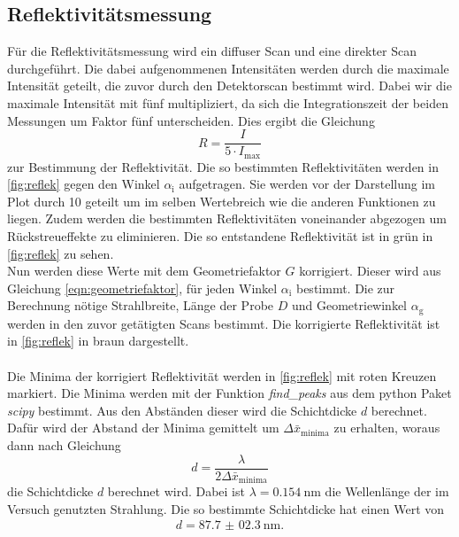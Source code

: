\subsection{Reflektivitätsmessung}
Für die Reflektivitätsmessung wird ein diffuser Scan und eine direkter Scan durchgeführt.
Die dabei aufgenommenen Intensitäten werden durch die maximale Intensität geteilt, die zuvor durch den Detektorscan bestimmt wird.
Dabei wir die maximale Intensität mit fünf multipliziert, da sich die Integrationszeit der beiden Messungen um Faktor fünf unterscheiden.
Dies ergibt die Gleichung 
\begin{equation*}
    R = \frac{I}{5\cdot I_\text{max}}
\end{equation*} 
zur Bestimmung der Reflektivität.
Die so bestimmten Reflektivitäten werden in \autoref{fig:reflek} gegen den Winkel $\alpha_\text{i}$ aufgetragen.
Sie werden vor der Darstellung im Plot durch 10 geteilt um im selben Wertebreich wie die anderen Funktionen zu liegen.
Zudem werden die bestimmten Reflektivitäten voneinander abgezogen um Rückstreueffekte zu eliminieren.
Die so entstandene Reflektivität ist in grün in \autoref{fig:reflek} zu sehen.
\\
Nun werden diese Werte mit dem Geometriefaktor $G$ korrigiert.
Dieser wird aus Gleichung \eqref{eqn:geometriefaktor}, für jeden Winkel $\alpha_\text{i}$ bestimmt.
Die zur Berechnung nötige Strahlbreite, Länge der Probe $D$ und Geometriewinkel $\alpha_\text{g}$ werden in den zuvor getätigten Scans bestimmt.
Die korrigierte Reflektivität ist in \autoref{fig:reflek} in braun dargestellt.
\\\\
Die Minima der korrigiert Reflektivität werden in \autoref{fig:reflek} mit roten Kreuzen markiert.
Die Minima werden mit der Funktion \textit{find\_peaks} aus dem python Paket \textit{scipy} \cite{scipy} bestimmt.
Aus den Abständen dieser wird die Schichtdicke $d$ berechnet.
Dafür wird der Abstand der Minima gemittelt um $\Delta \bar{x} _\text{minima}$ zu erhalten, woraus dann nach Gleichung
\begin{equation*}
    d = \frac{\lambda}{2\Delta \bar{x} _\text{minima}}
\end{equation*}
die Schichtdicke $d$ berechnet wird.
Dabei ist $\lambda = \SI{0.154}{\nano\meter}$ die Wellenlänge der im Versuch genutzten Strahlung.
Die so bestimmte Schichtdicke hat einen Wert von
\begin{align*}
    d = \SI{87.7(023)}{\nano\meter}.
\end{align*}

